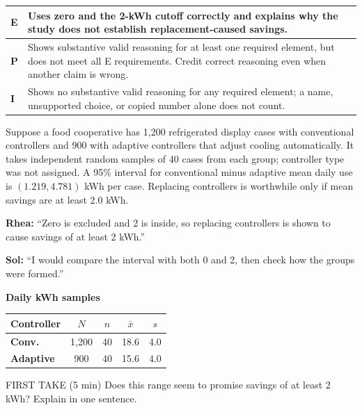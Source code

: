 \documentclass[11pt]{article}
\begin{document}
{\small\renewcommand{\arraystretch}{1.25}
\noindent\begin{tabular}{|p{0.5in}|p{5.9in}|}
\hline
\textbf{E} & Uses zero and the 2-kWh cutoff correctly and explains why the study does not establish replacement-caused savings. \\ \hline
\textbf{P} & Shows substantive valid reasoning for at least one required element, but does not meet all E requirements. Credit correct reasoning even when another claim is wrong. \\ \hline
\textbf{I} & Shows no substantive valid reasoning for any required element; a name, unsupported choice, or copied number alone does not count. \\ \hline
\end{tabular}}

\clearpage
{}

Suppose a food cooperative has 1{,}200 refrigerated display cases with conventional controllers and 900 with adaptive controllers that adjust cooling automatically. It takes independent random samples of 40 cases from each group; controller type was not assigned. A 95\% interval for conventional minus adaptive mean daily use is $(1.219,4.781)$ kWh per case. Replacing controllers is worthwhile only if mean savings are at least 2.0 kWh.\par\smallskip \textbf{Rhea:} ``Zero is excluded and 2 is inside, so replacing controllers is shown to cause savings of at least 2 kWh.''\par \textbf{Sol:} ``I would compare the interval with both 0 and 2, then check how the groups were formed.''\par
\begin{center}
\textbf{Daily kWh samples}\par\smallskip
\begin{tabular}{|l|c|c|c|c|}
\hline
\textbf{Controller} & \textbf{$N$} & \textbf{$n$} & \textbf{$\bar x$} & \textbf{$s$} \\ \hline
\textbf{Conv.} & 1,200 & 40 & 18.6 & 4.0 \\ \hline
\textbf{Adaptive} & 900 & 40 & 15.6 & 4.0 \\ \hline
\end{tabular}
\end{center}
\begin{firsttakebox}{FIRST TAKE (5 min)}
Does this range seem to promise savings of at least 2 kWh? Explain in one sentence.\par
{}
\end{firsttakebox}
\end{document}
